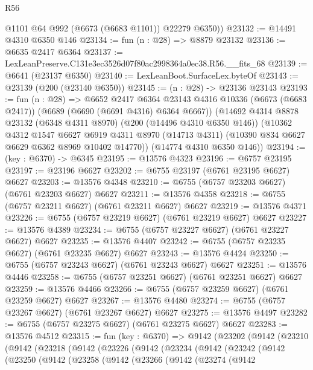 \begin{lexlean}{R56}
\begin{coremodule}
        @1101
        @64
        @992
        (@6673 (@6683 @1101))
        @22279
        @6350))
@23132 := @14491 @4310 @6350 @146
@23134 := fun (n : @28) => @8879 @23132
@23136 := @6635 @2417 @6364
@23137 := LexLeanPreserve.C131e3ec3526d07f80ac2998364a0ec38.R56.__fits_68
@23139 := @6641 (@23137 @6350)
@23140 := LexLeanBoot.SurfaceLex.byteOf
@23143 := @23139 (@200 (@23140 @6350))
@23145 := (n : @28) -> @23136 @23143
@23193 := fun (n : @28) =>
  @6652
    @2417
    @6364
    @23143
    @4316
    @10336
    (@6673 (@6683 @2417))
    (@6689 (@6690 (@6691 @4316) @6364 @6667))
    (@14692
      @4314
      @8878
      @23132
      (@6348 @4311 @8970)
      (@200 (@14496 @4310 @6350 @146))
      (@10362
        @4312
        @1547
        @6627
        @6919
        @4311
        @8970
        (@14713 @4311)
        (@10390 @834 @6627 @6629 @6362 @8969 @10402 @14770))
      (@14774 @4310 @6350 @146))
@23194 := (key : @6370) -> @6345
@23195 := @13576 @4323
@23196 := @6757 @23195
@23197 := @23196 @6627
@23202 := @6755 @23197 (@6761 @23195 @6627) @6627
@23203 := @13576 @4348
@23210 := @6755 (@6757 @23203 @6627) (@6761 @23203 @6627) @6627
@23211 := @13576 @4358
@23218 := @6755 (@6757 @23211 @6627) (@6761 @23211 @6627) @6627
@23219 := @13576 @4371
@23226 := @6755 (@6757 @23219 @6627) (@6761 @23219 @6627) @6627
@23227 := @13576 @4389
@23234 := @6755 (@6757 @23227 @6627) (@6761 @23227 @6627) @6627
@23235 := @13576 @4407
@23242 := @6755 (@6757 @23235 @6627) (@6761 @23235 @6627) @6627
@23243 := @13576 @4424
@23250 := @6755 (@6757 @23243 @6627) (@6761 @23243 @6627) @6627
@23251 := @13576 @4446
@23258 := @6755 (@6757 @23251 @6627) (@6761 @23251 @6627) @6627
@23259 := @13576 @4466
@23266 := @6755 (@6757 @23259 @6627) (@6761 @23259 @6627) @6627
@23267 := @13576 @4480
@23274 := @6755 (@6757 @23267 @6627) (@6761 @23267 @6627) @6627
@23275 := @13576 @4497
@23282 := @6755 (@6757 @23275 @6627) (@6761 @23275 @6627) @6627
@23283 := @13576 @4512
@23315 := fun (key : @6370) =>
  @9142
    (@23202
      (@9142
        (@23210
          (@9142
            (@23218
              (@9142
                (@23226
                  (@9142
                    (@23234
                      (@9142
                        (@23242
                          (@9142
                            (@23250
                              (@9142
                                (@23258
                                  (@9142
                                    (@23266
                                      (@9142
                                        (@23274
                                          (@9142

\end{coremodule}
\end{lexlean}
